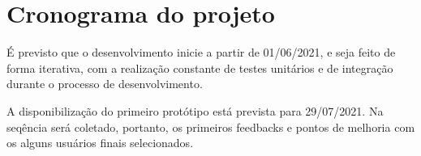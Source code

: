 \chapter{Cronograma do projeto}
\label{c.cronograma}


É previsto que o desenvolvimento inicie a partir de 01/06/2021, e seja feito de forma iterativa, com a realização constante de testes unitários e de integração durante o processo de desenvolvimento.

A disponibilização do primeiro protótipo está prevista para 29/07/2021. Na seqência será coletado, portanto, os primeiros feedbacks e pontos de melhoria com os alguns usuários finais selecionados.


